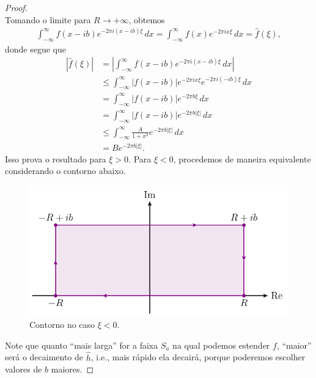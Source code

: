 \begin{proof}
\begin{equation*}
            \end{equation*}
            Tomando o limite para $R\to +\infty$, obtemos
            \begin{align*}
                \int_{-\infty}^{\infty} f(x-ib)e^{-2\pi i(x-ib)\xi} \, dx
                =
                \int_{-\infty}^{\infty} f(x)e^{-2\pi ix\xi} \, dx
                =
                \widehat{f}(\xi),
            \end{align*}
            donde segue que
            \begin{align*}
                |\widehat{f}(\xi)| &=\left|\int_{-\infty}^{\infty} f(x-ib)e^{-2\pi i(x-ib)\xi} \, dx\right| \\
                                   &\leq\int_{-\infty}^{\infty}|f(x-ib)|e^{-2\pi ix\xi}e^{-2\pi i(-ib)\xi}\,dx \\
                                   &= \int_{-\infty}^{\infty}|f(x-ib)|e^{-2\pi b\xi} \,dx \\
                                   &= \int_{-\infty}^{\infty}|f(x-ib)|e^{-2\pi b|\xi|} \,dx \\
                                   &\leq \int_{-\infty}^{\infty} \frac{A}{1+x^2}e^{-2\pi b|\xi|} \, dx \\
                                   &= Be^{-2\pi b|\xi|}.
            \end{align*}
            Isso prova o resultado para $\xi > 0$. Para $\xi < 0$, procedemos de maneira equivalente considerando
            o contorno abaixo.
            \begin{figure}[H]\centering 
				\includegraphics{Figuras/contorno xi<0.pdf}
				\caption{Contorno no caso $\xi < 0$.}
			\end{figure}
            Note que quanto ``mais larga'' for a faixa $S_a$ na qual podemos estender $f$, ``maior'' será o 
            decaimento de $\widehat{h}$, i.e., mais rápido ela decairá, porque poderemos escolher valores de
            $b$ maiores.
        \end{proof}
